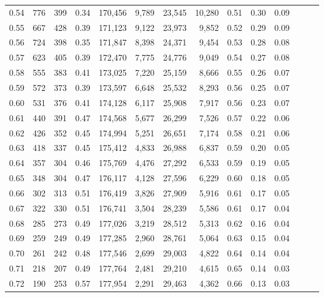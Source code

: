 \begin{tabular}{rrrrrrrrrrrrrr}
0.54 &    776 &  399 &  0.34 &  170,456 &    9,789 &  23,545 &  10,280 &  0.51 &  0.30 &      0.09 \\
0.55 &    667 &  428 &  0.39 &  171,123 &    9,122 &  23,973 &   9,852 &  0.52 &  0.29 &      0.09 \\
0.56 &    724 &  398 &  0.35 &  171,847 &    8,398 &  24,371 &   9,454 &  0.53 &  0.28 &      0.08 \\
0.57 &    623 &  405 &  0.39 &  172,470 &    7,775 &  24,776 &   9,049 &  0.54 &  0.27 &      0.08 \\
0.58 &    555 &  383 &  0.41 &  173,025 &    7,220 &  25,159 &   8,666 &  0.55 &  0.26 &      0.07 \\
0.59 &    572 &  373 &  0.39 &  173,597 &    6,648 &  25,532 &   8,293 &  0.56 &  0.25 &      0.07 \\
0.60 &    531 &  376 &  0.41 &  174,128 &    6,117 &  25,908 &   7,917 &  0.56 &  0.23 &      0.07 \\
0.61 &    440 &  391 &  0.47 &  174,568 &    5,677 &  26,299 &   7,526 &  0.57 &  0.22 &      0.06 \\
0.62 &    426 &  352 &  0.45 &  174,994 &    5,251 &  26,651 &   7,174 &  0.58 &  0.21 &      0.06 \\
0.63 &    418 &  337 &  0.45 &  175,412 &    4,833 &  26,988 &   6,837 &  0.59 &  0.20 &      0.05 \\
0.64 &    357 &  304 &  0.46 &  175,769 &    4,476 &  27,292 &   6,533 &  0.59 &  0.19 &      0.05 \\
0.65 &    348 &  304 &  0.47 &  176,117 &    4,128 &  27,596 &   6,229 &  0.60 &  0.18 &      0.05 \\
0.66 &    302 &  313 &  0.51 &  176,419 &    3,826 &  27,909 &   5,916 &  0.61 &  0.17 &      0.05 \\
0.67 &    322 &  330 &  0.51 &  176,741 &    3,504 &  28,239 &   5,586 &  0.61 &  0.17 &      0.04 \\
0.68 &    285 &  273 &  0.49 &  177,026 &    3,219 &  28,512 &   5,313 &  0.62 &  0.16 &      0.04 \\
0.69 &    259 &  249 &  0.49 &  177,285 &    2,960 &  28,761 &   5,064 &  0.63 &  0.15 &      0.04 \\
0.70 &    261 &  242 &  0.48 &  177,546 &    2,699 &  29,003 &   4,822 &  0.64 &  0.14 &      0.04 \\
0.71 &    218 &  207 &  0.49 &  177,764 &    2,481 &  29,210 &   4,615 &  0.65 &  0.14 &      0.03 \\
0.72 &    190 &  253 &  0.57 &  177,954 &    2,291 &  29,463 &   4,362 &  0.66 &  0.13 &      0.03 \\

\end{tabular}
